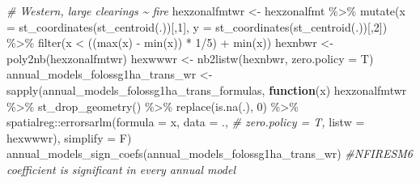 \documentclass[10pt,landscape,a3paper]{article}
\newenvironment{Shaded}{\begin{snugshade}}{\end{snugshade}}
\newcommand{\AttributeTok}[1]{\textcolor[rgb]{0.77,0.63,0.00}{#1}}
\newcommand{\CommentTok}[1]{\textcolor[rgb]{0.56,0.35,0.01}{\textit{#1}}}
\newcommand{\ControlFlowTok}[1]{\textcolor[rgb]{0.13,0.29,0.53}{\textbf{#1}}}
\newcommand{\DecValTok}[1]{\textcolor[rgb]{0.00,0.00,0.81}{#1}}
\newcommand{\FunctionTok}[1]{\textcolor[rgb]{0.00,0.00,0.00}{#1}}
\newcommand{\NormalTok}[1]{#1}
\newcommand{\OtherTok}[1]{\textcolor[rgb]{0.56,0.35,0.01}{#1}}
\newcommand{\SpecialCharTok}[1]{\textcolor[rgb]{0.00,0.00,0.00}{#1}}
\begin{document}
\begin{Shaded}
\begin{Highlighting}[]
\CommentTok{\# Western, large clearings \textasciitilde{} fire}
\NormalTok{hexzonalfmtwr }\OtherTok{\textless{}{-}}\NormalTok{ hexzonalfmt }\SpecialCharTok{\%\textgreater{}\%}
  \FunctionTok{mutate}\NormalTok{(}\AttributeTok{x =} \FunctionTok{st\_coordinates}\NormalTok{(}\FunctionTok{st\_centroid}\NormalTok{(.))[,}\DecValTok{1}\NormalTok{], }\AttributeTok{y =} \FunctionTok{st\_coordinates}\NormalTok{(}\FunctionTok{st\_centroid}\NormalTok{(.))[,}\DecValTok{2}\NormalTok{]) }\SpecialCharTok{\%\textgreater{}\%}
  \FunctionTok{filter}\NormalTok{(x }\SpecialCharTok{\textless{}}\NormalTok{ ((}\FunctionTok{max}\NormalTok{(x) }\SpecialCharTok{{-}} \FunctionTok{min}\NormalTok{(x)) }\SpecialCharTok{*} \DecValTok{1}\SpecialCharTok{/}\DecValTok{5}\NormalTok{) }\SpecialCharTok{+} \FunctionTok{min}\NormalTok{(x))}
\NormalTok{hexnbwr }\OtherTok{\textless{}{-}} \FunctionTok{poly2nb}\NormalTok{(hexzonalfmtwr)}
\NormalTok{hexwwwr }\OtherTok{\textless{}{-}} \FunctionTok{nb2listw}\NormalTok{(hexnbwr, }\AttributeTok{zero.policy =}\NormalTok{ T)}
\NormalTok{annual\_models\_folossg1ha\_trans\_wr }\OtherTok{\textless{}{-}} \FunctionTok{sapply}\NormalTok{(annual\_models\_folossg1ha\_trans\_formulas,}
                        \ControlFlowTok{function}\NormalTok{(x)}
\NormalTok{                          hexzonalfmtwr }\SpecialCharTok{\%\textgreater{}\%}
                          \FunctionTok{st\_drop\_geometry}\NormalTok{() }\SpecialCharTok{\%\textgreater{}\%}
                          \FunctionTok{replace}\NormalTok{(}\FunctionTok{is.na}\NormalTok{(.), }\DecValTok{0}\NormalTok{) }\SpecialCharTok{\%\textgreater{}\%}
\NormalTok{                          spatialreg}\SpecialCharTok{::}\FunctionTok{errorsarlm}\NormalTok{(}\AttributeTok{formula =}\NormalTok{ x,}
                                                 \AttributeTok{data =}\NormalTok{ ., }\CommentTok{\# zero.policy = T,}
                                                 \AttributeTok{listw =}\NormalTok{ hexwwwr),}
                        \AttributeTok{simplify =}\NormalTok{ F)}
\FunctionTok{annual\_models\_sign\_coefs}\NormalTok{(annual\_models\_folossg1ha\_trans\_wr) }\CommentTok{\#NFIRESM6 coefficient is significant in every annual model}


\end{Highlighting}
\end{Shaded}
\end{document}
